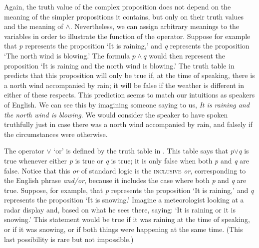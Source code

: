 Again, the truth value of the complex proposition does not depend on the meaning of the simpler propositions it contains, but only on their truth values and the meaning of \textit{$\wedge$}. Nevertheless, we can assign arbitrary meanings to the variables in order to illustrate the function of the operator. Suppose for example that \textit{p} represents the proposition ‘It is raining,’ and \textit{q} represents the proposition ‘The north wind is blowing.’ The formula $p \wedge q$ would then represent the proposition ‘It is raining and the north wind is blowing.’ The truth table in  predicts that this proposition will only be true if, at the time of speaking, there is a north wind accompanied by rain; it will be false if the weather is different in either of these respects. This prediction seems to match our intuitions as speakers of English. We can see this by imagining someone saying to us, \textit{It is raining and the north wind is blowing}. We would consider the speaker to have spoken truthfully just in case there was a north wind accompanied by rain, and falsely if the circumstances were otherwise.



The operator $\vee$ ‘or’ is defined by the truth table in . This table says that \textit{p}$\vee$\textit{q} is true whenever either \textit{p} is true or \textit{q} is true; it is only false when both \textit{p} and \textit{q} are false. Notice that this \textit{or} of standard logic is the \textsc{inclusive} \textit{or}, corresponding to the English phrase \textit{and/or}, because it includes the case where both \textit{p} and \textit{q} are true. Suppose, for example, that \textit{p} represents the proposition ‘It is raining,’ and \textit{q} represents the proposition ‘It is snowing.’ Imagine a meteorologist looking at a radar display and, based on what he sees there, saying: ‘It is raining or it is snowing.’ This statement would be true if it was raining at the time of speaking, or if it was snowing, or if both things were happening at the same time. (This last possibility is rare but not impossible.)




